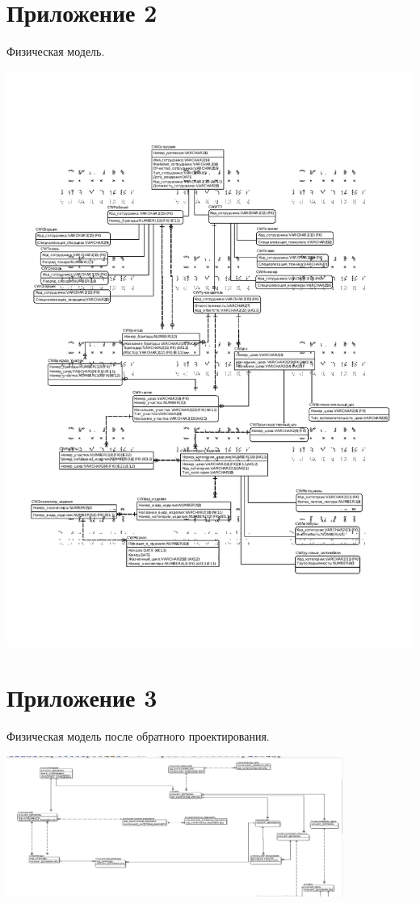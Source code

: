 \section{Приложение 2}

    Физическая модель.

    \includegraphics[width=14cm]{./screenshots/model/physical.png}

\section{Приложение 3}

    Физическая модель после обратного проектирования.

    \includegraphics[width=11cm]{./screenshots/model/reverse1.png}

